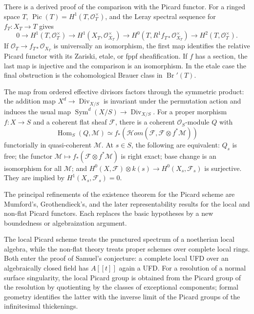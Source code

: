 \begin{remark}\label{fga-rem-9-2-11}
There is a derived proof of the comparison with the Picard functor.  For a ringed
space $T$, $\operatorname{Pic}(T)=H^1(T,\mathcal O_T^\times)$, and the Leray
spectral sequence for $f_T:X_T\to T$ gives
\[
0\to H^1(T,\mathcal O_T^\times)\to H^1(X_T,\mathcal O_{X_T}^\times)
\to H^0(T,R^1f_{T*}\mathcal O_{X_T}^\times)\to H^2(T,\mathcal O_T^\times).
\]
If $\mathcal O_T\to f_{T*}\mathcal O_{X_T}$ is universally an isomorphism,
the first map identifies the relative Picard functor with its Zariski, etale,
or fppf sheafification.  If $f$ has a section, the last map is injective and
the comparison is an isomorphism.  In the etale case the final obstruction is
the cohomological Brauer class in $\operatorname{Br}'(T)$.
\end{remark}

\begin{remark}\label{fga-rem-9-3-9}\uses{}
The map from ordered effective divisors factors through the symmetric product:
the addition map $X^d\to\operatorname{Div}_{X/S}$ is invariant under the
permutation action and induces the usual map $\operatorname{Sym}^d(X/S)\to
\operatorname{Div}_{X/S}$.  For a proper morphism $f:X\to S$ and a coherent
flat sheaf $\mathcal F$, there is a coherent $\mathcal O_S$-module $Q$ with
\[
\operatorname{Hom}_S(Q,\mathcal M)\simeq
f_*(\mathcal H om(\mathcal F,\mathcal F\otimes f^*\mathcal M))
\]
functorially in quasi-coherent $\mathcal M$.  At $s\in S$, the following are
equivalent: $Q_s$ is free; the functor $\mathcal M\mapsto
f_*(\mathcal F\otimes f^*\mathcal M)$ is right exact; base change is an
isomorphism for all $\mathcal M$; and
$H^0(X,\mathcal F)\otimes k(s)\to H^0(X_s,\mathcal F_s)$ is surjective.
They are implied by $H^1(X_s,\mathcal F_s)=0$.
\end{remark}

\begin{remark}\label{fga-rem-9-4-18}
The principal refinements of the existence theorem for the Picard scheme are
Mumford's, Grothendieck's, and the later representability results for the local
and non-flat Picard functors.  Each replaces the basic hypotheses by a new
boundedness or algebraization argument.
\end{remark}

\begin{remark}\label{fga-rem-9-4-19}\uses{}
The local Picard scheme treats the punctured spectrum of a noetherian local
algebra, while the non-flat theory treats proper schemes over complete local
rings.  Both enter the proof of Samuel's conjecture: a complete local UFD over
an algebraically closed field has $A[[t]]$ again a UFD.  For a resolution of a
normal surface singularity, the local Picard group is obtained from the Picard
group of the resolution by quotienting by the classes of exceptional components;
formal geometry identifies the latter with the inverse limit of the Picard
groups of the infinitesimal thickenings.
\end{remark}

